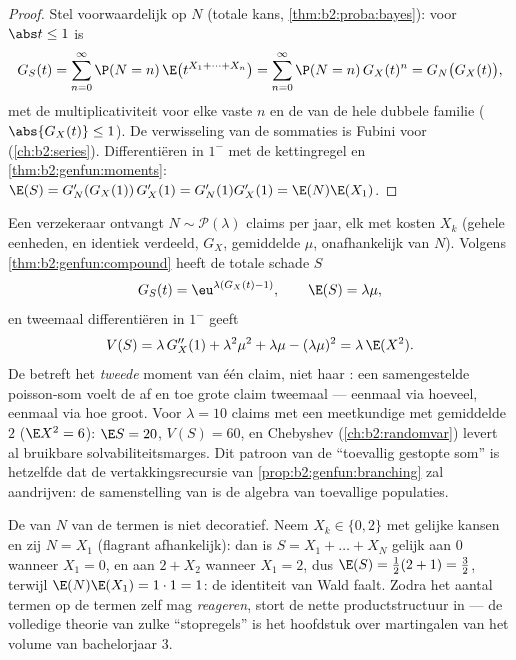 \begin{proof}
Stel voorwaardelijk op $N$ (totale kans,
\cref{thm:b2:proba:bayes}): voor $\abs t \leq 1$ is
\[
G_S(t) = \sum_{n=0}^\infty \P(N = n)\,
\E\bigl(t^{X_1 + \dots + X_n}\bigr)
= \sum_{n=0}^\infty \P(N = n)\,G_X(t)^n
= G_N\bigl(G_X(t)\bigr),
\]
met de multiplicativiteit voor elke vaste $n$ en de
 van de hele dubbele familie ($\abs{G_X(t)} \leq
1$). De verwisseling van de sommaties is Fubini voor  (\cref{ch:b2:series}). Differentiëren in $1^-$ met de
kettingregel en \cref{thm:b2:genfun:moments}: $\E(S) =
G_N'(G_X(1))\,G_X'(1) = G_N'(1)G_X'(1) = \E(N)\E(X_1)$.
\end{proof}

\begin{example}\label{ex:b2:genfun:compoundpoisson}
Een verzekeraar ontvangt $N \sim \mathcal P(\lambda)$ claims per
jaar, elk met kosten $X_k$ (gehele eenheden,  en
identiek verdeeld,  $G_X$, gemiddelde $\mu$,
onafhankelijk van $N$). Volgens
\cref{thm:b2:genfun:compound} heeft de totale schade $S$
\[
G_S(t) = \eu^{\lambda(G_X(t) - 1)},
\qquad
\E(S) = \lambda\mu ,
\]
en tweemaal differentiëren in $1^-$ geeft
\[
V(S) = \lambda\,G_X''(1) + \lambda^2\mu^2 + \lambda\mu -
(\lambda\mu)^2 = \lambda\,\E(X^2) .
\]
De  betreft het \emph{tweede} moment van één claim, niet
haar : een samengestelde poisson-som voelt de af en toe
grote claim tweemaal --- eenmaal via hoeveel, eenmaal via hoe
groot. Voor $\lambda = 10$ claims met een meetkundige  met
gemiddelde $2$ ($\E X^2 = 6$): $\E S = 20$, $V(S) = 60$, en
Chebyshev (\cref{ch:b2:randomvar}) levert al bruikbare
solvabiliteitsmarges. Dit patroon van de ``toevallig gestopte som''
is hetzelfde dat de vertakkingsrecursie van
\cref{prop:b2:genfun:branching} zal aandrijven: de samenstelling
van  is de algebra van toevallige populaties.
\end{example}

\begin{remark}
De  van $N$ van de termen is niet decoratief. Neem
$X_k \in \{0, 2\}$ met gelijke kansen en zij $N = X_1$ (flagrant
afhankelijk): dan is $S = X_1 + \dots + X_N$ gelijk aan $0$ wanneer
$X_1 = 0$, en aan $2 + X_2$ wanneer $X_1 = 2$, dus $\E(S) =
\frac12(2 + 1) = \frac32$, terwijl $\E(N)\E(X_1) = 1\cdot1 = 1$: de
identiteit van Wald faalt. Zodra het aantal termen op de termen
zelf mag \emph{reageren}, stort de nette productstructuur in --- de
volledige theorie van zulke ``stopregels'' is het hoofdstuk over
martingalen van het volume van bachelorjaar 3.
\end{remark}

